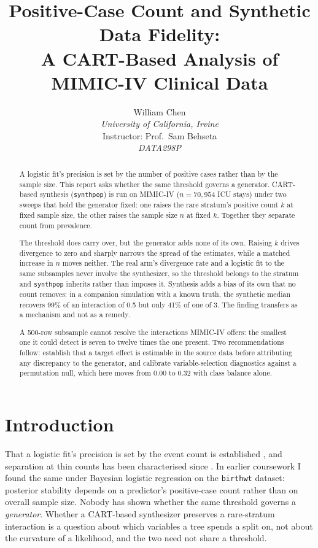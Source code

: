 \documentclass[11pt]{article}
\title{\textbf{Positive-Case Count and Synthetic Data Fidelity:\\
A CART-Based Analysis of MIMIC-IV Clinical Data}}
\author{
    William Chen\\
    \textit{University of California, Irvine}\\
    Instructor: Prof.\ Sam Behseta\\
    \textit{DATA298P}\\[4pt]
}
\date{}
\begin{document}
\maketitle

\begin{abstract}
A logistic fit's precision is set by the number of positive cases rather than by
the sample size. This report asks whether the same threshold governs a
generator. CART-based synthesis (\texttt{synthpop}) is run on MIMIC-IV
($n = 70{,}954$ ICU stays) under two sweeps that hold the generator fixed: one
raises the rare stratum's positive count $k$ at fixed sample size, the other
raises the sample size $n$ at fixed $k$. Together they separate count from
prevalence.

The threshold does carry over, but the generator adds none of its own. Raising
$k$ drives divergence to zero and sharply narrows the spread of the estimates,
while a matched increase in $n$ moves neither. The real arm's divergence
rate and a logistic fit to the same subsamples never involve the synthesizer, so
the threshold belongs to the stratum and \texttt{synthpop} inherits rather than
imposes it. Synthesis adds a bias of its own that no count
removes: in a companion simulation with a known truth, the synthetic median
recovers 99\% of an interaction of 0.5 but only 41\% of one of 3. The finding
transfers as a mechanism and not as a remedy.

A 500-row subsample cannot resolve the interactions MIMIC-IV offers: the
smallest one it could detect is seven to twelve times the one present. Two
recommendations follow: establish that a target effect is estimable
in the source data before attributing any discrepancy to the generator, and
calibrate variable-selection diagnostics against a permutation null, which here
moves from 0.00 to 0.32 with class balance alone.
\end{abstract}

\section{Introduction}

That a logistic fit's precision is set by the event count is established
\cite{peduzzi1996, vansmeden2016}, and separation at thin counts has been
characterised since \cite{albert1984}. In earlier coursework I found the same
under Bayesian logistic regression on the \texttt{birthwt} dataset: posterior
stability depends on a predictor's positive-case count rather than on overall
sample size. Nobody has shown whether the same threshold governs a
\emph{generator}. Whether a CART-based synthesizer preserves a rare-stratum
interaction is a question about which variables a tree spends a split on, not
about the curvature of a likelihood, and the two need not share a threshold.
\end{document}
